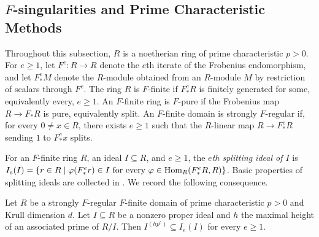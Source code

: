 \documentclass[12pt]{amsart}
\numberwithin{equation}{theorem}
\theoremstyle{plain}
\newcommand{\fm}{\mathfrak{m}}
\newcommand{\NN}{\mathbb{N}}
\begin{document}

\subsection{$F$-singularities and Prime Characteristic Methods}

Throughout this subsection, $R$ is a noetherian ring of prime characteristic $p>0$. For $e\geq 1$, let $F^e:R\to R$ denote the $e$th iterate of the Frobenius endomorphism, and let $F^e_*M$ denote the $R$-module obtained from an $R$-module $M$ by restriction of scalars through $F^e$. The ring $R$ is $F$-finite if $F^e_*R$ is finitely generated for some, equivalently every, $e\geq 1$. An $F$-finite ring is $F$-pure if the Frobenius map $R\to F_*R$ is pure, equivalently split. An $F$-finite domain is strongly $F$-regular if, for every $0\not=x\in R$, there exists $e\geq 1$ such that the $R$-linear map $R\to F^e_*R$ sending $1$ to $F^e_*x$ splits.

For an $F$-finite ring $R$, an ideal $I\subseteq R$, and $e\geq 1$, the \emph{$e$th splitting ideal of $I$} is $I_e(I)=\{r\in R\mid \varphi(F^e_*r)\in I \text{ for every }\varphi\in\operatorname{Hom}_R(F^e_*R,R)\}$. Basic properties of splitting ideals are collected in \cite[Lemma~2.6]{PolstraUSTP}. We record the following consequence.

\begin{lemma}
    \label{lem: symbolic powers contained in splitting ideals}
    Let $R$ be a strongly $F$-regular $F$-finite domain of prime characteristic $p>0$ and Krull dimension $d$. Let $I\subseteq R$ be a nonzero proper ideal and $h$ the maximal height of an associated prime of $R/I$. Then $I^{(hp^e)}\subseteq I_e(I)$ for every $e\geq 1$.
\end{lemma}
\end{document}
